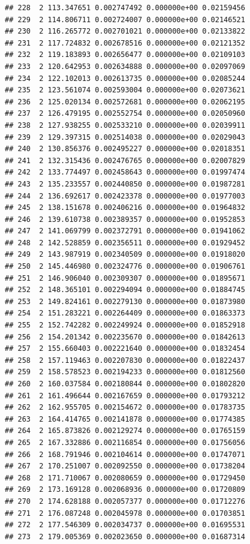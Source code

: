 \documentclass[article]{jss}\usepackage[]{graphicx}\usepackage[]{xcolor}
\makeatletter
\newenvironment{kframe}{%
 \def\at@end@of@kframe{}%
 \ifinner\ifhmode%
  \def\at@end@of@kframe{\end{minipage}}%
  \begin{minipage}{\columnwidth}%
 \fi\fi%
 \def\FrameCommand##1{\hskip\@totalleftmargin \hskip-\fboxsep
 \colorbox{shadecolor}{##1}\hskip-\fboxsep
     \hskip-\linewidth \hskip-\@totalleftmargin \hskip\columnwidth}%
 \MakeFramed {\advance\hsize-\width
   \@totalleftmargin\z@ \linewidth\hsize
   \@setminipage}}%
 {\par\unskip\endMakeFramed%
 \at@end@of@kframe}
\newenvironment{knitrout}{}{} %
\makeatother
\begin{document}
\begin{knitrout}
\begin{kframe}
\begin{verbatim}
## 228  2 113.347651 0.002747492 0.000000e+00 0.02159456
## 229  2 114.806711 0.002724007 0.000000e+00 0.02146521
## 230  2 116.265772 0.002701021 0.000000e+00 0.02133822
## 231  2 117.724832 0.002678516 0.000000e+00 0.02121352
## 232  2 119.183893 0.002656477 0.000000e+00 0.02109103
## 233  2 120.642953 0.002634888 0.000000e+00 0.02097069
## 234  2 122.102013 0.002613735 0.000000e+00 0.02085244
## 235  2 123.561074 0.002593004 0.000000e+00 0.02073621
## 236  2 125.020134 0.002572681 0.000000e+00 0.02062195
## 237  2 126.479195 0.002552754 0.000000e+00 0.02050960
## 238  2 127.938255 0.002533210 0.000000e+00 0.02039911
## 239  2 129.397315 0.002514038 0.000000e+00 0.02029043
## 240  2 130.856376 0.002495227 0.000000e+00 0.02018351
## 241  2 132.315436 0.002476765 0.000000e+00 0.02007829
## 242  2 133.774497 0.002458643 0.000000e+00 0.01997474
## 243  2 135.233557 0.002440850 0.000000e+00 0.01987281
## 244  2 136.692617 0.002423378 0.000000e+00 0.01977003
## 245  2 138.151678 0.002406216 0.000000e+00 0.01964832
## 246  2 139.610738 0.002389357 0.000000e+00 0.01952853
## 247  2 141.069799 0.002372791 0.000000e+00 0.01941062
## 248  2 142.528859 0.002356511 0.000000e+00 0.01929452
## 249  2 143.987919 0.002340509 0.000000e+00 0.01918020
## 250  2 145.446980 0.002324776 0.000000e+00 0.01906761
## 251  2 146.906040 0.002309307 0.000000e+00 0.01895671
## 252  2 148.365101 0.002294094 0.000000e+00 0.01884745
## 253  2 149.824161 0.002279130 0.000000e+00 0.01873980
## 254  2 151.283221 0.002264409 0.000000e+00 0.01863373
## 255  2 152.742282 0.002249924 0.000000e+00 0.01852918
## 256  2 154.201342 0.002235670 0.000000e+00 0.01842613
## 257  2 155.660403 0.002221640 0.000000e+00 0.01832454
## 258  2 157.119463 0.002207830 0.000000e+00 0.01822437
## 259  2 158.578523 0.002194233 0.000000e+00 0.01812560
## 260  2 160.037584 0.002180844 0.000000e+00 0.01802820
## 261  2 161.496644 0.002167659 0.000000e+00 0.01793212
## 262  2 162.955705 0.002154672 0.000000e+00 0.01783735
## 263  2 164.414765 0.002141878 0.000000e+00 0.01774385
## 264  2 165.873826 0.002129274 0.000000e+00 0.01765159
## 265  2 167.332886 0.002116854 0.000000e+00 0.01756056
## 266  2 168.791946 0.002104614 0.000000e+00 0.01747071
## 267  2 170.251007 0.002092550 0.000000e+00 0.01738204
## 268  2 171.710067 0.002080659 0.000000e+00 0.01729450
## 269  2 173.169128 0.002068936 0.000000e+00 0.01720809
## 270  2 174.628188 0.002057377 0.000000e+00 0.01712276
## 271  2 176.087248 0.002045978 0.000000e+00 0.01703851
## 272  2 177.546309 0.002034737 0.000000e+00 0.01695531
## 273  2 179.005369 0.002023650 0.000000e+00 0.01687314

\end{verbatim}
\end{kframe}
\end{knitrout}
\end{document}
